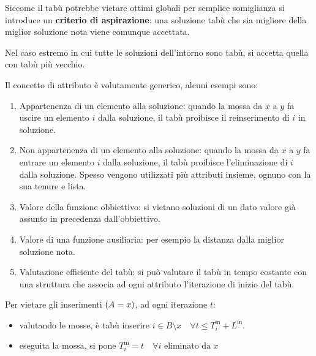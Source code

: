 \documentclass[\main/main.tex]{subfiles}
\begin{document}
\begin{multicols}{2}
\begin{definition}
    Siccome il tabù potrebbe vietare ottimi globali per semplice somiglianza si introduce un \textbf{criterio di aspirazione}: una soluzione tabù che sia migliore della miglior soluzione nota viene comunque accettata.
    
    Nel caso estremo in cui tutte le soluzioni dell'intorno sono tabù, si accetta quella con tabù più vecchio.
\end{definition}
\begin{definition}
    Il concetto di attributo è volutamente generico, alcuni esempi sono:
    \begin{enumerate}
        \item Appartenenza di un elemento alla soluzione: quando la mossa da \(x\) a \(y\) fa uscire un elemento \(i\) dalla soluzione, il tabù proibisce il reinserimento di \(i\) in soluzione.
        \item Non appartenenza di un elemento alla soluzione: quando la mossa da \(x\) a \(y\) fa entrare un elemento \(i\) dalla soluzione, il tabù proibisce l'eliminazione di \(i\) dalla soluzione. Spesso vengono utilizzati più attributi insieme, ognuno con la sua tenure e lista.
        \item Valore della funzione obbiettivo: si vietano soluzioni di un dato valore già assunto in precedenza dall'obbiettivo.
        \item Valore di una funzione ausiliaria: per esempio la distanza dalla miglior soluzione nota.
        \item Valutazione efficiente del tabù: si può valutare il tabù in tempo costante con una struttura che associa ad ogni attributo l'iterazione di inizio del tabù.
    \end{enumerate}
\end{definition}
\begin{observation}
    Per vietare gli inserimenti \(\left(A = x\right)\), ad ogni iterazione \(t\):
    \begin{itemize}
        \item valutando le mosse, è tabù inserire \(i \in B\setminus x \quad \forall t \leq T_i^{\text{in}} + L^{\text{in}}\).
        \item eseguita la mossa, si pone \(T^{\text{in}}_i = t \quad \forall i \text{ eliminato da } x\)
    \end{itemize}
\end{observation}
\begin{observation}

\end{observation}
\end{multicols}
\end{document}
